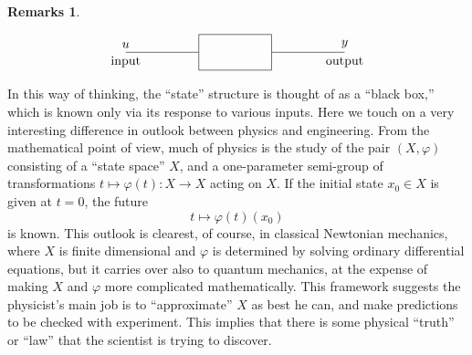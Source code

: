 \documentclass[12pt]{book}
\theoremstyle{plain}
\theoremstyle{definition}
\newtheorem*{remarks}{Remarks}
\begin{document}
\begin{remarks}
\begin{enumerate}
    \begin{equation*}
    \begin{tikzpicture}
        \node[draw, rectangle, minimum width=2cm, minimum height=1cm] (box) at (0,0) {};
        \draw (box.west) -- ++(-2,0) node[above]{$u$} node[below]{input};
        \draw (box.east) -- ++(2,0) node[above]{$y$} node[below]{output};
    \end{tikzpicture}
    \end{equation*}
    
    In this way of thinking, the ``state'' structure is thought of as a ``black box,'' which is known only via its response to various inputs.
    Here we touch on a very interesting difference in outlook between physics and engineering.
    From the mathematical point of view, much of physics is the study of the pair $(X, \varphi)$ consisting of a ``state space'' $X$, and a one-parameter semi-group of transformations $t \mapsto \varphi(t): X \to X$ acting on $X$.
    If the initial state $x_0 \in X$ is given at $t = 0$, the future
    $$t \mapsto \varphi(t)(x_0)$$
    is known.
    This outlook is clearest, of course, in classical Newtonian mechanics, where $X$ is finite dimensional and $\varphi$ is determined by solving ordinary differential equations, but it carries over also to quantum mechanics, at the expense of making $X$ and $\varphi$ more complicated mathematically.
    This framework suggests the physicist's main job is to ``approximate'' $X$ as best he can, and make predictions to be checked with experiment.
    This implies that there is some physical ``truth'' or ``law'' that the scientist is trying to discover.
\end{enumerate}
\end{remarks}
\end{document}
